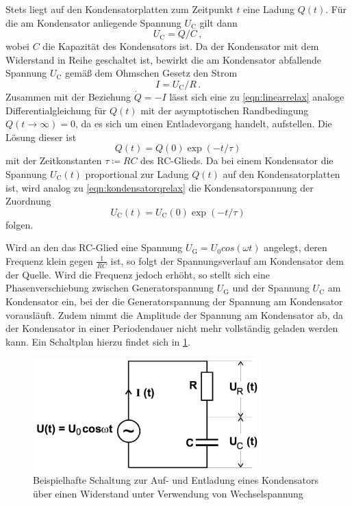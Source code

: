 Stets liegt auf den Kondensatorplatten zum Zeitpunkt $t$ eine Ladung $Q(t)$. Für
die am Kondensator anliegende Spannung $U_{\text{C}}$ gilt dann
\begin{equation}
  U_{\text{C}} = Q / C\,,
\end{equation}
wobei $C$ die Kapazität des Kondensators ist. Da der Kondensator mit dem Widerstand
in Reihe geschaltet ist, bewirkt die am Kondensator abfallende Spannung $U_{\text{C}}$
gemäß dem Ohmschen Gesetz den Strom
\begin{equation}
  I = U_{\text{C}} / R\,.
\end{equation}
Zusammen mit der Beziehung $\dot{Q} = -I$ lässt sich eine zu \eqref{eqn:linearrelax}
analoge Differentialgleichung für $Q(t)$ mit der asymptotischen Randbedingung
$Q(t \to \infty) = 0$, da es sich um einen Entladevorgang handelt, aufstellen. Die
Lösung dieser ist
\begin{equation}
  Q(t) = Q(0) \exp(-t/\tau)
  \label{eqn:kondensatorqrelax}
\end{equation}
mit der Zeitkonstanten $\tau \coloneqq RC$ des RC-Glieds.
Da bei einem Kondensator die Spannung $U_\text{C}(t)$ proportional zur Ladung
$Q(t)$ auf den Kondensatorplatten ist, wird analog zu \eqref{eqn:kondensatorqrelax}
die Kondensatorspannung der Zuordnung
\begin{equation}
  U_\text{C}(t) = U_\text{C}(0) \exp(-t/\tau)
  \label{eqn:kondensatorurelax}
\end{equation}
folgen.


Wird an den das RC-Glied eine Spannung $U_{\text{G}}=U_{\text{0}}cos(\omega t)$ angelegt, deren
Frequenz klein gegen $\frac{1}{RC}$ ist, so folgt der Spannungsverlauf am Kondensator
dem der Quelle. Wird die Frequenz jedoch erhöht, so stellt sich eine Phasenverschiebung
zwischen Generatorspannung $U_{\text{G}}$ und der Spannung $U_{\text{C}}$ am Kondensator
ein, bei der die Generatorspannung der Spannung am Kondensator vorausläuft.
Zudem nimmt die Amplitude der Spannung am Kondensator ab, da der Kondensator in einer
Periodendauer nicht mehr vollständig geladen werden kann. Ein Schaltplan hierzu findet
sich in \ref{fig:Aufbau_2}.
\begin{figure}
  \centering
  \includegraphics[width=250pt]{aufbau_2.png}
  \caption{Beispielhafte Schaltung zur Auf- und Entladung eines Kondensators über
  einen Widerstand unter Verwendung von Wechselspannung \cite{Versuchsanleitung}}
  \label{fig:Aufbau_2}
\end{figure}


